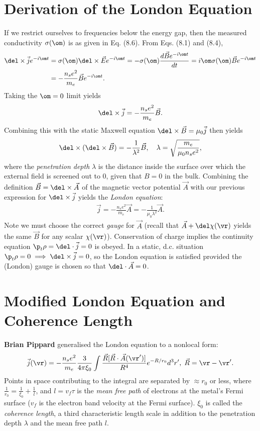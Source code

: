\documentclass[qo.tex]{subfiles}
\begin{document}
\section{Derivation of the London Equation}
If we restrict ourselves to frequencies below the energy gap, then the measured conductivity $\sigma(\om)$ is as given in Eq. (8.6).
From Eqs. (8.1) and (8.4),
\begin{align}
    \del\times\vec{j}e^{-i\om t} &= \sigma(\om)\del\times\vec{E}e^{-i\om t} = -\sigma(\om)\frac{d\vec{B}e^{-i\om t}}{dt} = i\om\sigma(\om)\vec{B}e^{-i\om t} \\
                                 &= -\frac{n_se^2}{m_e}\vec{B}e^{-i\om t}.
\end{align}
Taking the $\om=0$ limit yields
\begin{align}
    \del\times\vec{j}=-\frac{n_se^2}{m_e}\vec{B}.
\end{align}
Combining this with the static Maxwell equation $\del\times\vec{B}=\mu_0\vec{j}$ then yields
\begin{align}
    \del\times(\del\times\vec{B}) = -\frac{1}{\lambda^2}\vec{B},\quad \lambda = \sqrt{\frac{m_e}{\mu_0n_se^2}},
\end{align}
where the \emph{penetration depth} $\lambda$ is the distance inside the surface over which the external field is screened out to 0, given that $B=0$ in the bulk. 
Combining the definition $\vec{B}=\del\times\vec{A}$ of the magnetic vector potential $\vec{A}$ with our previous expression for $\del\times\vec{j}$ yields the \emph{London equation}:
\begin{align}
    \vec{j} = -\frac{n_se^2}{m_e}\vec{A} = -\frac{1}{\mu_0\lambda^2}\vec{A}.
\end{align}
Note we must choose the correct \emph{gauge} for $\vec{A}$ (recall that $\vec{A}+\del\chi(\vr)$ yields the same $\vec{B}$ for any scalar $\chi(\vr)$).
Conservation of charge implies the continuity equation $\p_t\rho=\del\cdot\vec{j}=0$ is obeyed.
In a static, d.c. situation $\p_t\rho=0\implies\del\times\vec{j}=0$, so the London equation is satisfied provided the (London) gauge is chosen so that $\del\cdot\vec{A}=0$.

\section{Modified London Equation and Coherence Length}
\textbf{Brian Pippard} generalised the London equation to a nonlocal form:
\begin{align}
    \vec{j}(\vr) = -\frac{n_se^2}{m_e}\frac{3}{4\pi\xi_0}\int \frac{\vec{R}[\vec{R}\cdot\vec{A}(\vr')]}{R^4}e^{-R/r_0}d^3r',\; \vec{R}=\vr-\vr'.
\end{align}
Points in space contributing to the integral are separated by $\approx r_0$ or less, where $\frac{1}{r_0}=\frac{1}{\xi_0}+\frac{1}{l}$, and $l=v_f\tau$ is the \emph{mean free path} of electrons at the metal's Fermi surface ($v_f$ is the electron band velocity at the Fermi surface).
$\xi_0$ is called the \emph{coherence length}, a third characteristic length scale in addition to the penetration depth $\lambda$ and the mean free path $l$.
\end{document}

